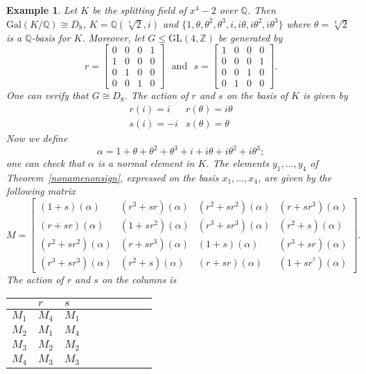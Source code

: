\documentclass[12pt]{article}
\theoremstyle{plain}
\newtheorem{example}[theorem]{Example}
\newcommand{\Z}{\ensuremath{\mathbb{Z}}}
\newcommand{\Q}{\ensuremath{\mathbb{Q}}}
\begin{document}
\begin{example}
Let $K$ be the splitting field of $x^4-2$ over $\Q$. Then $\mathrm{Gal}(K/\Q) \cong D_8$, $K = \Q(\sqrt[4]{2},i)$ and $\lbrace 1, \theta, \theta^2, \theta^3, i, i\theta, i\theta^2, i\theta^3\rbrace$ where  $\theta = \sqrt[4]{2}$ is a $\Q$-basis for $K$. Moreover, let $G\leq \mathrm{GL}(4,\Z)$ be generated by 
$$
r = \begin{bmatrix}
0&0&0&1\\
1&0&0&0\\
0&1&0&0\\
0&0&1&0
\end{bmatrix} \,\,\,\, \text{and}\,\,\,\,
s = \begin{bmatrix}
1&0&0&0\\
0&0&0&1\\
0&0&1&0\\
0&1&0&0
\end{bmatrix}.
$$
One can verify that $G \cong D_8$. The action of $r$ and $s$ on the basis of $K$ is given by
$$
\begin{matrix}
r(i) = i &r(\theta) = i \theta \\
s(i) = -i & s(\theta) = \theta
\end{matrix}
$$
Now we define $$\alpha = 1+ \theta + \theta^2 + \theta^3 +i + i\theta + i\theta^2 + i\theta^3;$$
one can check  that $\alpha$ is a normal element in $K$. 
The elements $y_1,\dots,y_4$ of Theorem~\ref{nonamenonsign}, expressed 
on the basis $x_1,\dots,x_4$, are given by the following matrix
$$
M= \begin{bmatrix}
(1+s)(\alpha) & (r^3+sr)(\alpha) & (r^2+sr^2)(\alpha) & (r+sr^3)(\alpha)\\
(r+sr)(\alpha) & (1+sr^2)(\alpha) & (r^3+sr^3)(\alpha) & (r^2+s)(\alpha)\\
(r^2+sr^2)(\alpha) & (r+sr^3)(\alpha) & (1+s)(\alpha) & (r^3+sr)(\alpha)\\
(r^3+sr^3)(\alpha) & (r^2+s)(\alpha) & (r+sr)(\alpha) & (1+sr^^2)(\alpha)
\end{bmatrix}.
$$
The action of $r$ and $s$ on the columns is
\begin{table}[H]
\centering
\begin{tabular}{l|llllllll} 
 & $r$ & $s$ \\
 \hline
 $M_1$  & $M_4$ & $M_1$ \\
$M_2$ & $M_1$ & $M_4$ \\
$M_3$ & $M_2$ & $M_2$ \\
$M_4$ & $M_3$ & $M_3$ \\
\end{tabular}
\end{table}

\end{example} 
\end{document}
